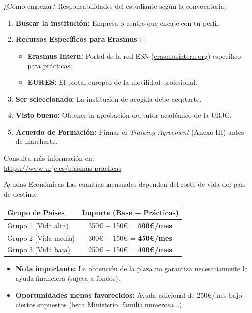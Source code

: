 \begin{frame}{¿Cómo empezar?}
    Responsabilidades del estudiante según la convocatoria:
    \begin{enumerate}
        \item \textbf{Buscar la institución:} Empresa o centro que encaje con tu perfil.
        \item \textbf{Recursos Específicos para Erasmus+:}
            \begin{itemize}
                \item \textbf{Erasmus Intern:} Portal de la red ESN (\url{erasmusintern.org}) específico para prácticas.
                \item \textbf{EURES:} El portal europeo de la movilidad profesional.
            \end{itemize}
        \item \textbf{Ser seleccionado:} La institución de acogida debe aceptarte.
        \item \textbf{Visto bueno:} Obtener la aprobación del tutor académico de la URJC.
        \item \textbf{Acuerdo de Formación:} Firmar el \textit{Training Agreement} (Anexo III) antes de marcharte.
    \end{enumerate}
    \vspace{0.3cm}
    \centering
    \small{Consulta más información en:\\ \url{https://www.urjc.es/erasmus-practicas}}
\end{frame}


\begin{frame}{Ayudas Económicas}
    Las cuantías mensuales dependen del coste de vida del país de destino:
    \begin{table}
        \centering
        \begin{tabular}{|l|c|}
            \hline
            \textbf{Grupo de Países} & \textbf{Importe (Base + Prácticas)} \\ \hline
            Grupo 1 (Vida alta) & 350€ + 150€ = \textbf{500€/mes} \\ \hline
            Grupo 2 (Vida media) & 300€ + 150€ = \textbf{450€/mes} \\ \hline
            Grupo 3 (Vida baja) & 250€ + 150€ = \textbf{400€/mes} \\ \hline
        \end{tabular}
    \end{table}
    \begin{itemize}
        \item \textbf{Nota importante:} La obtención de la plaza no garantiza necesariamente la ayuda financiera (sujeta a fondos).
        \item \textbf{Oportunidades menos favorecidos:} Ayuda adicional de 250€/mes bajo ciertos supuestos (beca Ministerio, familia numerosa...).
    \end{itemize}
\end{frame}

